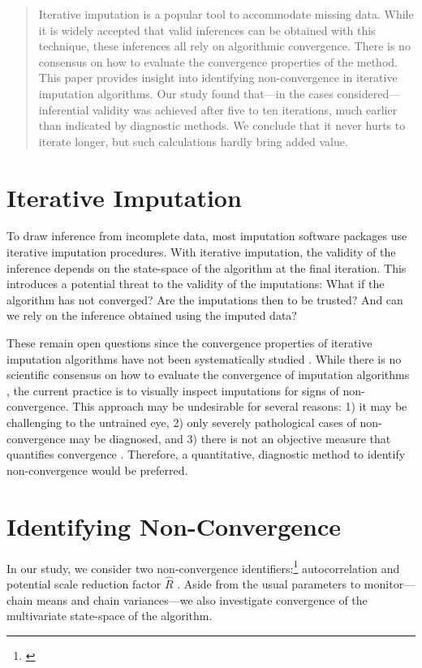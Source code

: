 \documentclass{article}
\begin{document}
\begin{abstract}
Iterative imputation is a popular tool to accommodate missing data. While it is widely accepted that valid inferences can be obtained with this technique, these inferences all rely on algorithmic convergence. There is no consensus on how to evaluate the convergence properties of the method. This paper provides insight into identifying non-convergence in iterative imputation algorithms. Our study found that---in the cases considered---inferential validity was achieved after five to ten iterations, much earlier than indicated by diagnostic methods. We conclude that it never hurts to iterate longer, but such calculations hardly bring added value.
\end{abstract}

\section{Iterative Imputation}
\label{intro}

To draw inference from incomplete data, most imputation software packages use iterative imputation procedures. With iterative imputation, the validity of the inference depends on the state-space of the algorithm at the final iteration. This introduces a potential threat to the validity of the imputations: What if the algorithm has not converged? Are the imputations then to be trusted? And can we rely on the inference obtained using the imputed data?

These remain open questions since the convergence properties of iterative imputation algorithms have not been systematically studied \citep[\(\S\) 6.5.2]{buur18}. While there is no scientific consensus on how to evaluate the convergence of imputation algorithms \citep{zhu15, taka17}, the current practice is to visually inspect imputations for signs of non-convergence. This approach may be undesirable for several reasons: 1) it may be challenging to the untrained eye, 2) only severely pathological cases of non-convergence may be diagnosed, and 3) there is not an objective measure that quantifies convergence \citep[\(\S\) 6.5.2]{buur18}. Therefore, a quantitative, diagnostic method to identify non-convergence would be preferred. 

\section{Identifying Non-Convergence}
\label{methods}

In our study, we consider two non-convergence identifiers:\footnote{\citep[as recommended~by~e.g.][]{cowl96}} autocorrelation \citep[conform][p.~147]{lync07} and potential scale reduction factor $\widehat{R}$ \citep[conform][p.~5]{veht19}. Aside from the usual parameters to monitor---chain means and chain variances---we also investigate convergence of the multivariate state-space of the algorithm. 
\end{document}
